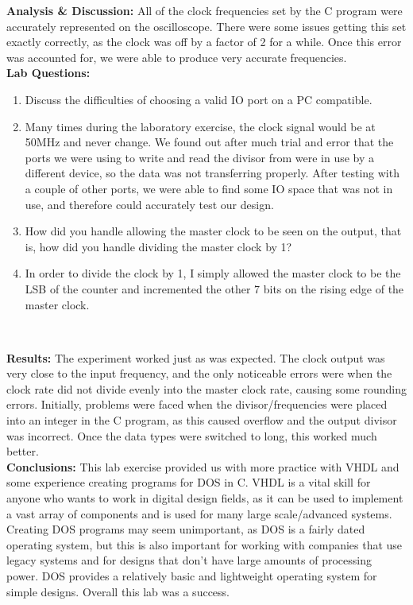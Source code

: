 \documentclass{article}
\newcommand{\Q}{\textbf{Q:}}
\newcommand{\A}{\textbf{A:}}
\newcommand{\sect}[1]{\noindent\textbf{#1}}
\begin{document}
\sect{Analysis \& Discussion:} All of the clock frequencies set by the C program were accurately represented on the oscilloscope. There were some issues getting this set exactly correctly, as the clock was off by a factor of 2 for a while. Once this error was accounted for, we were able to produce very accurate frequencies.\\

\sect{Lab Questions:}

\begin{enumerate}
	\item[\Q] Discuss the difficulties of choosing a valid IO port on a PC compatible.
	\item[\A] Many times during the laboratory exercise, the clock signal would be at 50MHz and never change. We found out after much trial and error that the ports we were using to write and read the divisor from were in use by a different device, so the data was not transferring properly. After testing with a couple of other ports, we were able to find some IO space that was not in use, and therefore could accurately test our design.
	\item[\Q] How did you handle allowing the master clock to be seen on the output, that is, how did you handle dividing the master clock by 1?
	\item[\A] In order to divide the clock by 1, I simply allowed the master clock to be the LSB of the counter and incremented the other 7 bits on the rising edge of the master clock. 
\end{enumerate}~

\sect{Results:} The experiment worked just as was expected. The clock output was very close to the input frequency, and the only noticeable errors were when the clock rate did not divide evenly into the master clock rate, causing some rounding errors. Initially, problems were faced when the divisor/frequencies were placed into an integer in the C program, as this caused overflow and the output divisor was incorrect. Once the data types were switched to long, this worked much better.\\

\sect{Conclusions:} This lab exercise provided us with more practice with VHDL and some experience creating programs for DOS in C. VHDL is a vital skill for anyone who wants to work in digital design fields, as it can be used to implement a vast array of components and is used for many large scale/advanced systems. Creating DOS programs may seem unimportant, as DOS is a fairly dated operating system, but this is also important for working with companies that use legacy systems and for designs that don't have large amounts of processing power. DOS provides a relatively basic and lightweight operating system for simple designs. Overall this lab was a success.
\end{document}
